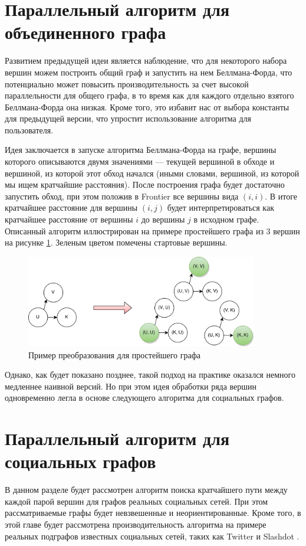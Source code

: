 \FloatBarrier
\section{Параллельный алгоритм для объединенного графа}
Развитием предыдущей идеи является наблюдение, что для некоторого набора вершин можем построить общий граф и запустить на нем Беллмана-Форда, что потенциально может повысить производительность за счет высокой параллельности для общего графа, в то время как для каждого отдельно взятого Беллмана-Форда она низкая. Кроме того, это избавит нас от выбора константы для предыдущей версии, что упростит использование алгоритма для пользователя. 

Идея заключается в запуске алгоритма Беллмана-Форда на графе, вершины которого описываются двумя значениями --- текущей вершиной в обходе и вершиной, из которой этот обход начался (иными словами, вершиной, из которой мы ищем кратчайшие расстояния). После построения графа будет достаточно запустить обход, при этом положив в Frontier все вершины вида $(i, i)$. В итоге кратчайшее расстояние для вершины $(i, j)$ будет интерпретироваться как кратчайшее расстояние от вершины $i$ до вершины $j$ в исходном графе. Описанный алгоритм иллюстрирован на примере простейшего графа из 3 вершин на рисунке \ref{floyd_par_common_graph}. Зеленым цветом помечены стартовые вершины.
\FloatBarrier

\begin{figure}[h]
\caption{Пример преобразования для простейшего графа}
\label {floyd_par_common_graph}
\centering
\includegraphics[width=0.9\textwidth]{img/floyd_par_2.png}
\end{figure}
\FloatBarrier

Однако, как будет показано позднее, такой подход на практике оказался немного медленнее наивной версий. Но при этом идея обработки ряда вершин одновременно легла в основе следующего алгоритма для социальных графов. 
\FloatBarrier
\section{Параллельный алгоритм для социальных графов}
В данном разделе будет рассмотрен алгоритм поиска кратчайшего пути между каждой парой вершин для графов реальных социальных сетей. При этом рассматриваемые графы будет невзвешенные и неориентированные. Кроме того, в этой главе будет рассмотрена производительность алгоритма на примере реальных подграфов известных социальных сетей, таких как Twitter и Slashdot \cite{STANFORDGRAPHS}.

